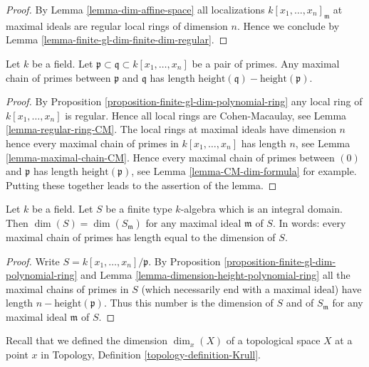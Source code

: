 \begin{proof}
By Lemma \ref{lemma-dim-affine-space}
all localizations $k[x_1, \ldots, x_n]_{\mathfrak m}$
at maximal ideals are regular local rings of dimension $n$. Hence
we conclude by Lemma \ref{lemma-finite-gl-dim-finite-dim-regular}.
\end{proof}

\begin{lemma}
\label{lemma-dimension-height-polynomial-ring}
Let $k$ be a field.
Let $\mathfrak p \subset \mathfrak q \subset k[x_1, \ldots, x_n]$
be a pair of primes.
Any maximal chain of primes between $\mathfrak p$ and $\mathfrak q$
has length $\text{height}(\mathfrak q) - \text{height}(\mathfrak p)$.
\end{lemma}

\begin{proof}
By
Proposition \ref{proposition-finite-gl-dim-polynomial-ring}
any local ring of $k[x_1, \ldots, x_n]$ is regular.
Hence all local rings are Cohen-Macaulay, see
Lemma \ref{lemma-regular-ring-CM}.
The local rings at maximal ideals have dimension $n$ hence
every maximal chain of primes in $k[x_1, \ldots, x_n]$
has length $n$, see
Lemma \ref{lemma-maximal-chain-CM}.
Hence every maximal chain of primes between $(0)$ and $\mathfrak p$
has length $\text{height}(\mathfrak p)$, see
Lemma \ref{lemma-CM-dim-formula}
for example.
Putting these together leads to the assertion of the lemma.
\end{proof}

\begin{lemma}
\label{lemma-dimension-spell-it-out}
Let $k$ be a field.
Let $S$ be a finite type $k$-algebra which is an integral domain.
Then $\dim(S) = \dim(S_{\mathfrak m})$ for any maximal
ideal $\mathfrak m$ of $S$. In words: every maximal chain
of primes has length equal to the dimension of $S$.
\end{lemma}

\begin{proof}
Write $S = k[x_1, \ldots, x_n]/\mathfrak p$.
By Proposition \ref{proposition-finite-gl-dim-polynomial-ring} and
Lemma \ref{lemma-dimension-height-polynomial-ring}
all the maximal chains of primes in $S$ (which necessarily end
with a maximal ideal) have length $n - \text{height}(\mathfrak p)$.
Thus this number is the dimension of $S$ and of $S_{\mathfrak m}$
for any maximal ideal $\mathfrak m$ of $S$.
\end{proof}

\noindent
Recall that we defined the
dimension $\dim_x(X)$ of a topological space $X$ at a point $x$
in Topology, Definition \ref{topology-definition-Krull}.

